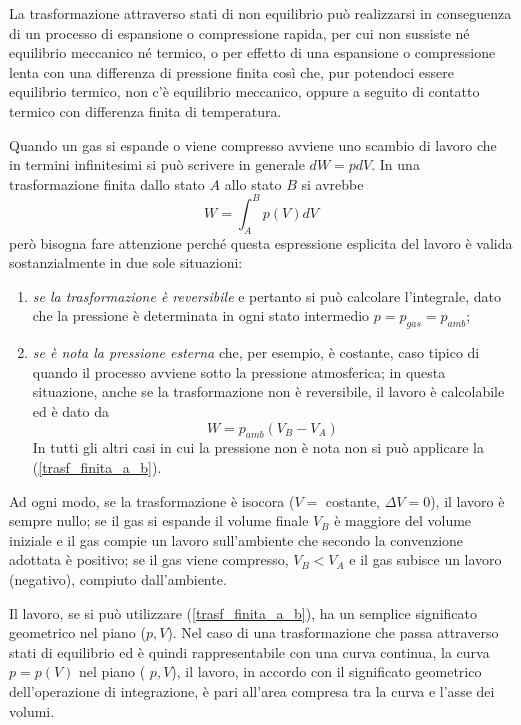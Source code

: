 \documentclass[class=book, crop=false, oneside, 12pt]{standalone}
\begin{document}
La trasformazione attraverso stati di non equilibrio può realizzarsi in conseguenza di un processo di espansione o compressione rapida, per cui non sussiste né equilibrio meccanico né termico, o per effetto di una espansione o compressione lenta con una differenza di pressione finita così che, pur potendoci essere equilibrio termico, non c'è equilibrio meccanico, oppure a seguito di contatto termico con differenza finita di temperatura.

Quando un gas si espande o viene compresso avviene uno scambio di lavoro che in termini infinitesimi si può scrivere in generale \( d W = p d V\). 
In una trasformazione finita dallo stato \(A\) allo stato \(B\) si avrebbe
\begin{equation} \label{trasf_finita_a_b}
    W = \int_A^B p(V) d V
\end{equation}
però bisogna fare attenzione perché questa espressione esplicita del lavoro è valida sostanzialmente in due sole situazioni: 
\begin{enumerate}
    \item \emph{se la trasformazione è reversibile} e pertanto si può calcolare l'integrale, dato che la pressione è determinata in ogni stato intermedio \(p = p_{gas} = p_{amb}\);
    \item \emph{se è nota la pressione esterna} che, per esempio, è costante, caso tipico di quando il processo avviene sotto la pressione atmosferica; in questa situazione, anche se la trasformazione non è reversibile, il lavoro è calcolabile ed è dato da
    \begin{equation*}
        W = p_{amb} (V_B - V_A)
    \end{equation*}
    In tutti gli altri casi in cui la pressione non è nota non si può applicare la (\ref{trasf_finita_a_b}).
\end{enumerate}

Ad ogni modo, se la trasformazione è isocora (\(V =\) costante, \(\Delta V = 0\)), il lavoro è sempre nullo; se il gas si espande il volume finale \(V_B\) è maggiore del volume iniziale e il gas compie un lavoro sull'ambiente che secondo la convenzione adottata è positivo; 
se il gas viene compresso, \(V_B < V_A\) e il gas subisce un lavoro (negativo), compiuto dall'ambiente.

Il lavoro, se si può utilizzare (\ref{trasf_finita_a_b}), ha un semplice significato geometrico nel piano (\(p,V\)). 
Nel caso di una trasformazione che passa attraverso stati di equilibrio ed è quindi rappresentabile con una curva continua, la curva \(p = p (V)\) nel piano ( \(p, V\)), il lavoro, in accordo con il significato geometrico dell'operazione di integrazione, è pari all'area compresa tra la curva e l'asse dei volumi. 
\end{document}
